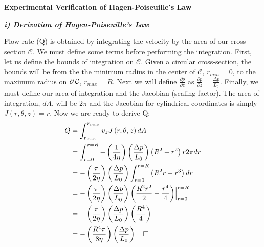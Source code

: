 \documentclass[titlepage]{article}
\begin{document}
\section{}
\begin{center}
    \large
    \textbf{Experimental Verification of Hagen-Poiseuille's Law} \\
\end{center} 
\begin{center}
    \textbf{\emph{i) Derivation of Hagen-Poiseuille's Law}}
\end{center}
\noindent Flow rate (Q) is obtained by integrating the velocity by the area of our cross-section $\mathcal{C}$. We must define some terms before performing the integration.
First, let us define the bounds of integration on $\mathcal{C}$. Given a circular cross-section, the bounds will be from the the minimum radius in the center of $\mathcal{C}$, $r_{min}=0$, to the maximum radius on $\partial\hspace*{2pt}\mathcal{C}$, $r_{max}=R$. Next we will define $\displaystyle\frac{\partial{p}}{\partial{z}}$ as $\displaystyle\frac{\partial{p}}{\partial{z}}=\displaystyle\frac{\Delta{p}}{L_{0}}$. Finally, we must define our area of integration and the Jacobian (scaling factor). The area of integration, $dA$, will be $2\pi$ and the Jacobian for cylindrical coordinates is simply $J\left(r,\theta,z\right)=r$. Now we are ready to derive Q:
\begingroup
    \addtolength\jot{6pt}
    \begin{align}
        Q&=\int_{r_{min}}^{r_{max}}v_{z}J\left(r,\theta,z\right)dA\\
        &=\int_{r=0}^{r=R}-\left(\displaystyle\frac{1}{4\eta}\right)
        \left(\displaystyle\frac{\Delta{p}}{L_{0}}\right)\left(R^2-r^2\right){r}2\pi{dr} \\
        &=-\left(\displaystyle\frac{\pi}{2\eta}\right)
        \left(\displaystyle\frac{\Delta{p}}{L_{0}}\right)\int_{r=0}^{r=R}\left(R^2r-r^3\right)dr \\
        &=-\left(\displaystyle\frac{\pi}{2\eta}\right)
        \left(\displaystyle\frac{\Delta{p}}{L_{0}}\right)\left(\displaystyle\frac{R^2r^2}{2}-\displaystyle\frac{r^4}{4}\right)\Bigr|_{r=0}^{r=R} \\
        &=-\left(\displaystyle\frac{\pi}{2\eta}\right)
        \left(\displaystyle\frac{\Delta{p}}{L_{0}}\right)\left(\displaystyle\frac{R^4}{4}\right) \\
        &=-\left(\displaystyle\frac{R^4\pi}{8\eta}\right)
        \left(\displaystyle\frac{\Delta{p}}{L_{0}}\right)\hspace*{5pt}\hspace*{5pt}\square
    \end{align}
\endgroup
\end{document}
